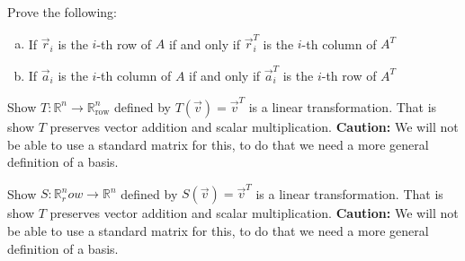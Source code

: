 \begin{exercise}
Prove the following:
\begin{enumerate}[a)]
\item If $\vec{r}_i$ is the $i$-th row of $A$ if and only if $\vec{r}_i^T$ is the $i$-th column of $A^T$ 
\item If $\vec{a}_i$ is the $i$-th column of $A$ if and only if $\vec{a}_i^T$ is the $i$-th row of $A^T$ 
\end{enumerate}
\end{exercise}

\begin{exercise}
Show $T:\mathbb{R}^n \to \mathbb{R}^n_\text{row}$ defined by $T(\vec{v})=\vec{v}^T$ is a linear transformation. That is show $T$ preserves vector addition and scalar multiplication. \textbf{Caution:} We will not be able to use a standard matrix for this, to do that we need a more general definition of a basis.
\end{exercise}

\begin{exercise}
Show $S:\mathbb{R}^n_row \to \mathbb{R}^n$ defined by $S(\vec{v})=\vec{v}^T$ is a linear transformation. That is show $T$ preserves vector addition and scalar multiplication. \textbf{Caution:} We will not be able to use a standard matrix for this, to do that we need a more general definition of a basis.
\end{exercise}